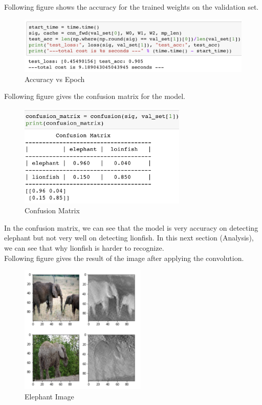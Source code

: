 \documentclass[12pt]{article}
\begin{document}
		\newline
		Following figure shows the accuracy for the trained weights on the validation set.
		\begin{figure}[ht]
			\begin{center}
				\includegraphics[width = 12cm]{acc_val}
			\end{center}
			\caption{Accuracy vs Epoch}
		\end{figure}
		\newpage
		\noindent
		Following figure gives the confusion matrix for the model.
		\begin{figure}[ht]
			\begin{center}
				\includegraphics[width = 8cm]{confusion}
			\end{center}
			\caption{Confusion Matrix}
		\end{figure}
		\newline
		In the confusion matrix, we can see that the model is very accuracy on detecting elephant but not very well on detecting lionfish. In this next section (Analysis), we can see that why lionfish is harder to recognize.\\
		Following figure gives the result of the image after applying the convolution.
		\begin{figure}[ht]
			\begin{center}
				\includegraphics[width = 6cm]{elephant}
			\end{center}
			\caption{Elephant Image}
		\end{figure}
\end{document}
